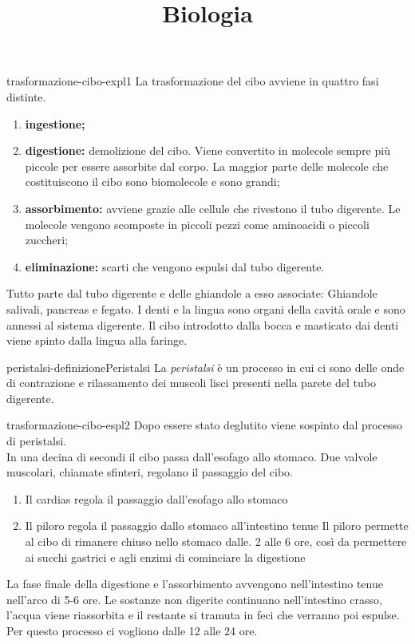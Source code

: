 \documentclass[preview]{standalone}
\begin{document}
\title{Biologia}
\genpage

\begin{snippet}{trasformazione-cibo-expl1}
    La trasformazione del cibo avviene in quattro fasi distinte.
    \begin{enumerate}
        \item \textbf{ingestione;}
        \item \textbf{digestione:} demolizione del cibo. Viene convertito in molecole sempre più piccole per essere
        assorbite dal corpo. La maggior parte delle molecole che costituiscono il cibo sono
        biomolecole e sono grandi;
        \item \textbf{assorbimento:} avviene grazie alle cellule che rivestono il tubo digerente.
        Le molecole vengono scomposte in piccoli pezzi come aminoacidi o piccoli zuccheri;
        \item \textbf{eliminazione:} scarti che vengono
        espulsi dal tubo digerente.
    \end{enumerate}

    Tutto parte dal tubo digerente e delle ghiandole a esso associate:
    Ghiandole salivali, pancreas e fegato. I denti e la lingua sono organi
    della cavità orale e sono annessi al sistema digerente.
    Il cibo introdotto dalla bocca e masticato dai denti viene spinto dalla
    lingua alla faringe.
\end{snippet}

\begin{snippetdefinition}{peristalsi-definizione}{Peristalsi}
    La \textit{peristalsi} è un processo in cui ci sono delle onde di
    contrazione e rilassamento dei muscoli lisci presenti nella
    parete del tubo digerente.
\end{snippetdefinition}

\begin{snippet}{trasformazione-cibo-espl2}
    Dopo essere stato deglutito viene sospinto dal
    processo di peristalsi.
    \\
    In una decina di secondi il cibo passa dall'esofago allo stomaco. Due
    valvole muscolari, chiamate sfinteri, regolano il passaggio del cibo.
    
    \begin{enumerate}
        \item Il cardias regola il passaggio dall'esofago allo stomaco
        \item Il piloro regola il passaggio dallo stomaco all'intestino tenue
        Il piloro permette al cibo di rimanere chiuso nello stomaco dalle.
        2 alle 6 ore, così da permettere ai succhi gastrici e agli enzimi
        di cominciare la digestione
    \end{enumerate}
    
    La fase finale della digestione e l'assorbimento avvengono
    nell'intestino tenue nell'arco di 5-6 ore. Le sostanze non digerite
    continuano nell'intestino crasso, l'acqua viene riassorbita e il restante
    si tramuta in feci che verranno poi espulse. Per questo processo ci
    vogliono dalle 12 alle 24 ore.
\end{snippet}
\end{document}
